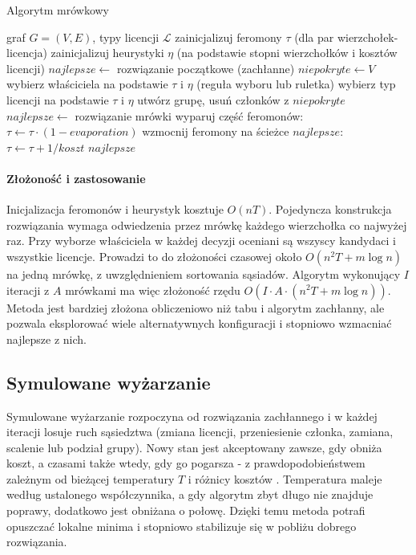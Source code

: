 \begin{algorithm}[H]
  \caption{Algorytm mrówkowy}
  \label{alg:aco}
  \begin{algorithmic}[1]
    \Require graf $G=(V,E)$, typy licencji $\mathcal{L}$
    \State zainicjalizuj feromony $\tau$ (dla par wierzchołek-licencja)
    \State zainicjalizuj heurystyki $\eta$ (na podstawie stopni wierzchołków i kosztów licencji)
    \State $najlepsze \gets$ rozwiązanie początkowe (zachłanne)
    \State $niepokryte \gets V$
    \State wybierz właściciela na podstawie $\tau$ i $\eta$ (reguła wyboru lub ruletka)
    \State wybierz typ licencji na podstawie $\tau$ i $\eta$
    \State utwórz grupę, usuń członków z $niepokryte$
    \EndWhile
    \State $najlepsze \gets$ rozwiązanie mrówki
    \EndIf
    \EndFor
    \State wyparuj część feromonów: $\tau \gets \tau \cdot (1-evaporation)$
    \State wzmocnij feromony na ścieżce $najlepsze$: $\tau \gets \tau + 1/koszt$
    \EndFor
    \State \Return $najlepsze$
  \end{algorithmic}
\end{algorithm}

\paragraph{Złożoność i zastosowanie}
Inicjalizacja feromonów i heurystyk kosztuje $O(nT)$. Pojedyncza konstrukcja rozwiązania wymaga odwiedzenia przez mrówkę każdego wierzchołka co najwyżej raz. Przy wyborze właściciela w każdej decyzji oceniani są wszyscy kandydaci i wszystkie licencje. Prowadzi to do złożoności czasowej około $O(n^2 T + m\log n)$ na jedną mrówkę, z uwzględnieniem sortowania sąsiadów. Algorytm wykonujący $I$ iteracji z $A$ mrówkami ma więc złożoność rzędu $O\!\left(I \cdot A \cdot (n^2 T + m\log n)\right)$. Metoda jest bardziej złożona obliczeniowo niż tabu i algorytm zachłanny, ale pozwala eksplorować wiele alternatywnych konfiguracji i stopniowo wzmacniać najlepsze z nich.


\subsection{Symulowane wyżarzanie }\label{subsec:sa}
Symulowane wyżarzanie rozpoczyna od rozwiązania zachłannego i w każdej iteracji losuje ruch sąsiedztwa (zmiana licencji, przeniesienie członka, zamiana, scalenie lub podział grupy). Nowy stan jest akceptowany zawsze, gdy obniża koszt, a czasami także wtedy, gdy go pogarsza - z prawdopodobieństwem zależnym od bieżącej temperatury \(T\) i różnicy kosztów \cite{kirkpatrick1983}. Temperatura maleje według ustalonego współczynnika, a gdy algorytm zbyt długo nie znajduje poprawy, dodatkowo jest obniżana o połowę. Dzięki temu metoda potrafi opuszczać lokalne minima i stopniowo stabilizuje się w pobliżu dobrego rozwiązania.

